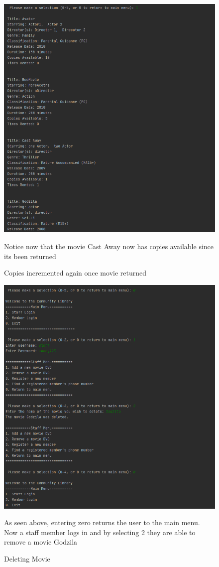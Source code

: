 \documentclass[a4paper,12pt]{article}
\begin{document}
\begin{figure}[!htb]
\centering
\includegraphics[width=1\textwidth]{11}
\caption{Copies incremented again once movie returned}
\medskip
\small
Notice now that the movie Cast Away now has copies available since its been returned
\end{figure}


\begin{figure}[!htb]
\centering
\includegraphics[width=1\textwidth]{12}
\caption{Deleting Movie}
\medskip
\small
As seen above, entering zero returns the user to the main menu. Now a staff member logs in and by selecting 2 they are able to remove a movie Godzila
\end{figure}
\end{document}
